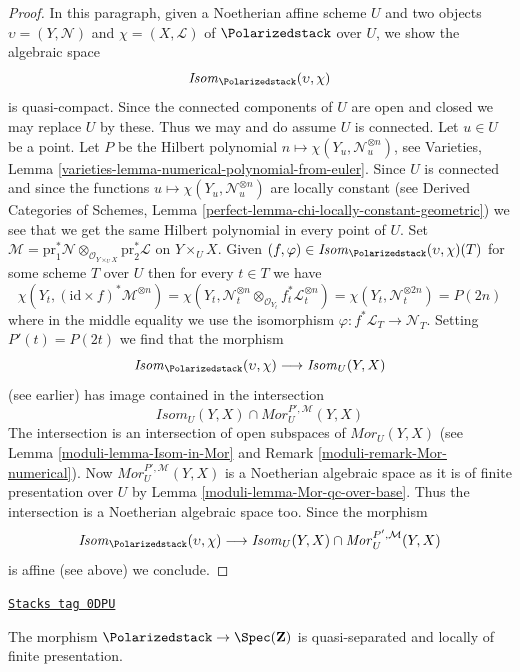 \begin{proof}
\medskip\noindent
In this paragraph, given a Noetherian affine scheme $U$ and two objects
$\upsilon = (Y, \mathcal{N})$ and $\chi = (X, \mathcal{L})$
of $\Polarizedstack$ over $U$, we show the algebraic space
$$
\mathit{Isom}_{\Polarizedstack}(\upsilon, \chi)
$$
is quasi-compact. Since the connected components of $U$ are open and closed
we may replace $U$ by these. Thus we may and do assume $U$ is connected.
Let $u \in U$ be a point. Let $P$ be the Hilbert polynomial
$n \mapsto \chi(Y_u, \mathcal{N}_u^{\otimes n})$, see
Varieties, Lemma \ref{varieties-lemma-numerical-polynomial-from-euler}.
Since $U$ is connected and since
the functions $u \mapsto \chi(Y_u, \mathcal{N}_u^{\otimes n})$
are locally constant (see
Derived Categories of Schemes, Lemma
\ref{perfect-lemma-chi-locally-constant-geometric})
we see that we get the same Hilbert polynomial in every point of $U$.
Set
$\mathcal{M} = \text{pr}_1^*\mathcal{N}
\otimes_{\mathcal{O}_{Y \times_U X}} \text{pr}_2^*\mathcal{L}$
on $Y \times_U X$. Given
$(f, \varphi) \in \mathit{Isom}_{\Polarizedstack}(\upsilon, \chi)(T)$
for some scheme $T$ over $U$ then for every $t \in T$ we have
$$
\chi(Y_t, (\text{id} \times f)^*\mathcal{M}^{\otimes n}) =
\chi(Y_t,
\mathcal{N}_t^{\otimes n} \otimes_{\mathcal{O}_{Y_t}}
f_t^*\mathcal{L}_t^{\otimes n}) =
\chi(Y_t, \mathcal{N}_t^{\otimes 2n}) = P(2n)
$$
where in the middle equality we use the isomorphism
$\varphi : f^*\mathcal{L}_T \to \mathcal{N}_T$.
Setting $P'(t) = P(2t)$ we find that the morphism
$$
\mathit{Isom}_{\Polarizedstack}(\upsilon, \chi)
\longrightarrow
\mathit{Isom}_U(Y, X)
$$
(see earlier) has image contained in the intersection
$$
\mathit{Isom}_U(Y, X) \cap \mathit{Mor}^{P', \mathcal{M}}_U(Y, X)
$$
The intersection is an intersection of open subspaces of
$\mathit{Mor}_U(Y, X)$ (see Lemma \ref{moduli-lemma-Isom-in-Mor} and
Remark \ref{moduli-remark-Mor-numerical}).
Now $\mathit{Mor}^{P', \mathcal{M}}_U(Y, X)$
is a Noetherian algebraic space as it is of finite
presentation over $U$ by Lemma \ref{moduli-lemma-Mor-qc-over-base}.
Thus the intersection
is a Noetherian algebraic space too. Since the morphism
$$
\mathit{Isom}_{\Polarizedstack}(\upsilon, \chi)
\longrightarrow
\mathit{Isom}_U(Y, X) \cap \mathit{Mor}^{P', \mathcal{M}}_U(Y, X)
$$
is affine (see above) we conclude.
\end{proof}

\begin{lemma}
\label{moduli-lemma-polarized-qs-lfp}
\href{https://stacks.math.columbia.edu/tag/0DPU}{\texttt{Stacks tag 0DPU}}

The morphism $\Polarizedstack \to \Spec(\mathbf{Z})$ is quasi-separated and
locally of finite presentation.
\end{lemma}

